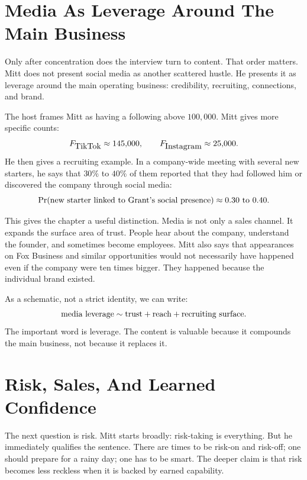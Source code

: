 \section{Media As Leverage Around The Main Business}

Only after concentration does the interview turn to content. That order matters. Mitt does not present social media as another scattered hustle. He presents it as leverage around the main operating business: credibility, recruiting, connections, and brand.

The host frames Mitt as having a following above \(100{,}000\). Mitt gives more specific counts:
\begin{equation}
  F_{\hbox{TikTok}}\approx 145{,}000,
  \qquad
  F_{\hbox{Instagram}}\approx 25{,}000.
\end{equation}
He then gives a recruiting example. In a company-wide meeting with several new starters, he says that \(30\%\) to \(40\%\) of them reported that they had followed him or discovered the company through social media:
\begin{equation}
  \Pr(\hbox{new starter linked to Grant's social presence})
  \approx
  0.30\hbox{ to }0.40.
\end{equation}

This gives the chapter a useful distinction. Media is not only a sales channel. It expands the surface area of trust. People hear about the company, understand the founder, and sometimes become employees. Mitt also says that appearances on Fox Business and similar opportunities would not necessarily have happened even if the company were ten times bigger. They happened because the individual brand existed.

As a schematic, not a strict identity, we can write:
\begin{equation}
  \hbox{media leverage}
  \sim
  \hbox{trust}
  +
  \hbox{reach}
  +
  \hbox{recruiting surface}.
\end{equation}
The important word is leverage. The content is valuable because it compounds the main business, not because it replaces it.

\section{Risk, Sales, And Learned Confidence}

The next question is risk. Mitt starts broadly: risk-taking is everything. But he immediately qualifies the sentence. There are times to be risk-on and risk-off; one should prepare for a rainy day; one has to be smart. The deeper claim is that risk becomes less reckless when it is backed by earned capability.

